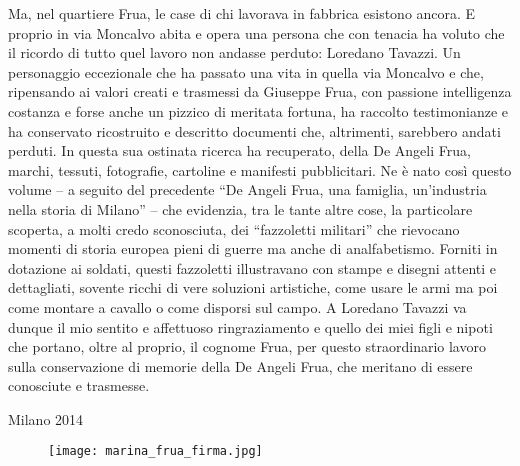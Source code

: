    Ma, nel quartiere Frua, le case di chi lavorava in fabbrica esistono ancora. E proprio in via Moncalvo abita e opera una persona che con tenacia ha voluto che il ricordo di tutto quel lavoro non andasse perduto: Loredano Tavazzi. Un personaggio eccezionale che ha passato una vita in quella via Moncalvo e che, ripensando ai valori creati e trasmessi da Giuseppe Frua, con passione intelligenza costanza e forse anche un pizzico di meritata fortuna, ha raccolto testimonianze e ha conservato ricostruito e descritto documenti che, altrimenti, sarebbero andati perduti. In questa sua ostinata ricerca ha recuperato, della De Angeli Frua, marchi, tessuti, fotografie, cartoline e manifesti pubblicitari.
   Ne è nato così questo volume – a seguito del precedente “De Angeli Frua, una famiglia, un’industria nella storia di Milano” – che evidenzia, tra le tante altre cose, la particolare scoperta, a molti credo sconosciuta, dei “fazzoletti militari” che rievocano momenti di storia europea pieni di guerre ma anche di analfabetismo. Forniti in dotazione ai soldati, questi fazzoletti illustravano con stampe e disegni attenti e dettagliati, sovente ricchi di vere soluzioni artistiche, come usare le armi ma poi come montare a cavallo o come disporsi sul campo.
   A Loredano Tavazzi va dunque il mio sentito e affettuoso ringraziamento e quello dei miei figli e nipoti che portano, oltre al proprio, il cognome Frua, per questo straordinario lavoro sulla conservazione di memorie della De Angeli Frua, che meritano di essere conosciute e trasmesse. 

Milano  2014

\begin{figure}[h]
	\centering
		\texttt{[image: marina\_frua\_firma.jpg]}
	\caption{}
	\label{fig:marina_frua_firma}
\end{figure}

\clearpage
